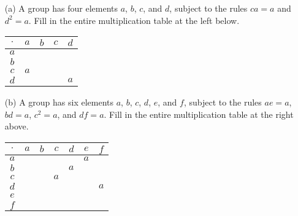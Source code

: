   \begin{exercise}[Shifrin 6.1.17]
    \begin{enumerate}
      \item[(a)] A group has four elements $a$, $b$, $c$, and $d$, subject to the rules $ca = a$ and $d^2 = a$. Fill in the entire multiplication table at the left below.
      
      \begin{tabular}{c|cccc}
        $\cdot$ & $a$ & $b$ & $c$ & $d$ \\
        \hline
        $a$ & & & & \\
        $b$ & & & & \\
        $c$ & $a$ & & & \\
        $d$ & & & & $a$ \\
      \end{tabular}
      
      \item[(b)] A group has six elements $a$, $b$, $c$, $d$, $e$, and $f$, subject to the rules $ae = a$, $bd = a$, $c^2 = a$, and $df = a$. Fill in the entire multiplication table at the right above.
      
      \begin{tabular}{c|cccccc}
        $\cdot$ & $a$ & $b$ & $c$ & $d$ & $e$ & $f$ \\
        \hline
        $a$ & & & & & $a$ & \\
        $b$ & & & & $a$ & & \\
        $c$ & & & $a$ & & & \\
        $d$ & & & & & & $a$ \\
        $e$ & & & & & & \\
        $f$ & & & & & & \\
      \end{tabular}
    \end{enumerate}
  \end{exercise}
